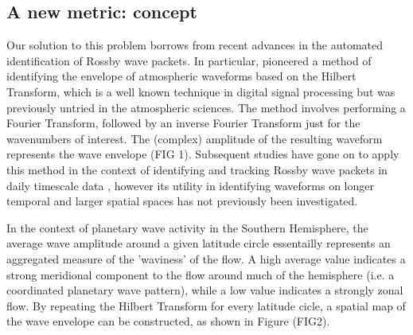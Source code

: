 \subsection{A new metric: concept}

Our solution to this problem borrows from recent advances in the automated identification of Rossby wave packets. In particular, \citet{Zimin2003} pioneered a method of identifying the envelope of atmospheric waveforms based on the Hilbert Transform, which is a well known technique in digital signal processing but was previously untried in the atmospheric sciences. The method involves performing a Fourier Transform, followed by an inverse Fourier Transform just for the wavenumbers of interest. The (complex) amplitude of the resulting waveform represents the wave envelope (FIG 1). Subsequent studies have gone on to apply this method in the context of identifying and tracking Rossby wave packets in daily timescale data \citep{Glatt2014,Souders2014a}, however its utility in identifying waveforms on longer temporal and larger spatial spaces has not previously been investigated.

In the context of planetary wave activity in the Southern Hemisphere, the average wave amplitude around a given latitude circle essentailly represents an aggregated measure of the 'waviness' of the flow. A high average value indicates a strong meridional component to the flow around much of the hemisphere (i.e. a coordinated planetary wave pattern), while a low value indicates a strongly zonal flow. By repeating the Hilbert Transform for every latitude cicle, a spatial map of the wave envelope can be constructed, as shown in Figure (FIG2).

